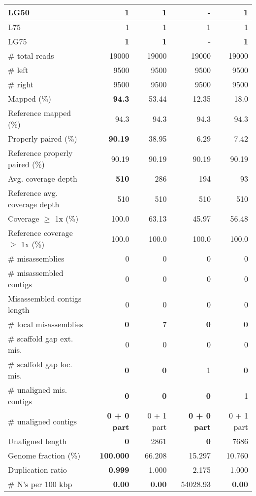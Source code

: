 \documentclass[12pt,a4paper]{article}
\begin{document}
\begin{table}[ht]
\begin{center}
\begin{tabular}{|l*{4}{|r}|}
LG50 & {\bf 1} & {\bf 1} & - & {\bf 1} \\ \hline
L75 & 1 & 1 & 1 & 1 \\ \hline
LG75 & {\bf 1} & {\bf 1} & - & {\bf 1} \\ \hline
\# total reads & 19000 & 19000 & 19000 & 19000 \\ \hline
\# left & 9500 & 9500 & 9500 & 9500 \\ \hline
\# right & 9500 & 9500 & 9500 & 9500 \\ \hline
Mapped (\%) & {\bf 94.3} & 53.44 & 12.35 & 18.0 \\ \hline
Reference mapped (\%) & 94.3 & 94.3 & 94.3 & 94.3 \\ \hline
Properly paired (\%) & {\bf 90.19} & 38.95 & 6.29 & 7.42 \\ \hline
Reference properly paired (\%) & 90.19 & 90.19 & 90.19 & 90.19 \\ \hline
Avg. coverage depth & {\bf 510} & 286 & 194 & 93 \\ \hline
Reference avg. coverage depth & 510 & 510 & 510 & 510 \\ \hline
Coverage $\geq$ 1x (\%) & 100.0 & 63.13 & 45.97 & 56.48 \\ \hline
Reference coverage $\geq$ 1x (\%) & 100.0 & 100.0 & 100.0 & 100.0 \\ \hline
\# misassemblies & 0 & 0 & 0 & 0 \\ \hline
\# misassembled contigs & 0 & 0 & 0 & 0 \\ \hline
Misassembled contigs length & 0 & 0 & 0 & 0 \\ \hline
\# local misassemblies & {\bf 0} & 7 & {\bf 0} & {\bf 0} \\ \hline
\# scaffold gap ext. mis. & 0 & 0 & 0 & 0 \\ \hline
\# scaffold gap loc. mis. & {\bf 0} & {\bf 0} & 1 & {\bf 0} \\ \hline
\# unaligned mis. contigs & {\bf 0} & {\bf 0} & {\bf 0} & 1 \\ \hline
\# unaligned contigs & {\bf 0 + 0 part} & 0 + 1 part & {\bf 0 + 0 part} & 0 + 1 part \\ \hline
Unaligned length & {\bf 0} & 2861 & {\bf 0} & 7686 \\ \hline
Genome fraction (\%) & {\bf 100.000} & 66.208 & 15.297 & 10.760 \\ \hline
Duplication ratio & {\bf 0.999} & 1.000 & 2.175 & 1.000 \\ \hline
\# N's per 100 kbp & {\bf 0.00} & {\bf 0.00} & 54028.93 & {\bf 0.00} \\ \hline

\end{tabular}
\end{center}
\end{table}
\end{document}
